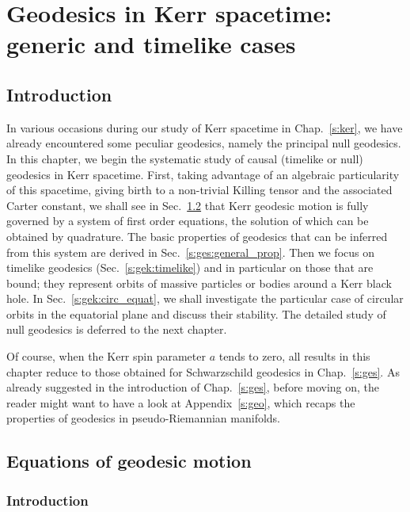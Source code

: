 \chapter{Geodesics in Kerr spacetime: generic and timelike cases}
\label{s:gek}

\minitoc

\section{Introduction}

In various occasions during our study of Kerr spacetime in Chap.~\ref{s:ker}, we have already
encountered some peculiar geodesics, namely
the principal null geodesics. In this chapter, we begin the systematic study of causal
(timelike or null) geodesics in Kerr spacetime.
First, taking advantage of an algebraic particularity of this spacetime, giving
birth to a non-trivial Killing tensor and the associated Carter constant,
we shall see in Sec.~\ref{s:ges:equat_geod_motion}
that Kerr geodesic motion is fully governed by a system of first order equations,
the solution of which can be obtained by quadrature.
The basic properties of geodesics that can be inferred from this system are derived
in Sec.~\ref{s:ges:general_prop}.
Then we focus on timelike geodesics (Sec.~\ref{s:gek:timelike}) and in particular
on those that are bound; they represent orbits of massive particles or bodies around a
Kerr black hole. In Sec.~\ref{s:gek:circ_equat}, we shall investigate the particular
case of circular orbits in the equatorial plane and discuss their stability.
The detailed study of null geodesics is deferred to the next chapter.

Of course, when the Kerr spin parameter $a$ tends to zero, all
results in this chapter reduce to those obtained for Schwarzschild geodesics
in Chap.~\ref{s:ges}. As already suggested in the introduction of Chap.~\ref{s:ges}, before moving on, the reader might want to have
a look at Appendix~\ref{s:geo}, which recaps the properties of geodesics in
pseudo-Riemannian manifolds.

\section{Equations of geodesic motion} \label{s:ges:equat_geod_motion}

\subsection{Introduction} \label{s:gek:geod_motion_intro}


